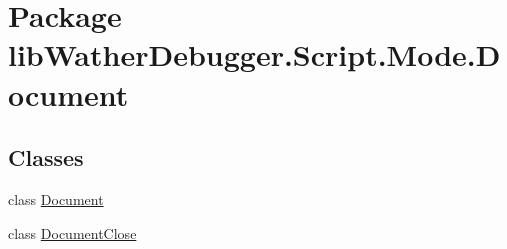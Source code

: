 \hypertarget{namespacelib_wather_debugger_1_1_script_1_1_mode_1_1_document}{\section{Package lib\+Wather\+Debugger.\+Script.\+Mode.\+Document}
\label{namespacelib_wather_debugger_1_1_script_1_1_mode_1_1_document}
}
\subsection*{Classes}
\begin{DoxyCompactItemize}
\item 
class \hyperlink{classlib_wather_debugger_1_1_script_1_1_mode_1_1_document_1_1_document}{Document}
\item 
class \hyperlink{classlib_wather_debugger_1_1_script_1_1_mode_1_1_document_1_1_document_close}{Document\+Close}
\end{DoxyCompactItemize}
